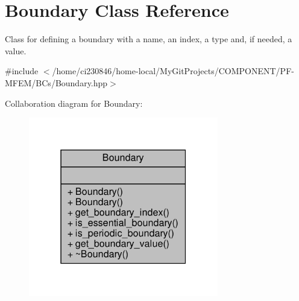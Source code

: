 \hypertarget{classBoundary}{}\section{Boundary Class Reference}
\label{classBoundary}


Class for defining a boundary with a name, an index, a type and, if needed, a value.  




{\ttfamily \#include $<$/home/ci230846/home-\/local/\+My\+Git\+Projects/\+C\+O\+M\+P\+O\+N\+E\+N\+T/\+P\+F-\/\+M\+F\+E\+M/\+B\+Cs/\+Boundary.\+hpp$>$}



Collaboration diagram for Boundary\+:\nopagebreak
\begin{figure}[H]
\begin{center}
\leavevmode
\includegraphics[width=235pt]{classBoundary__coll__graph}
\end{center}
\end{figure}
